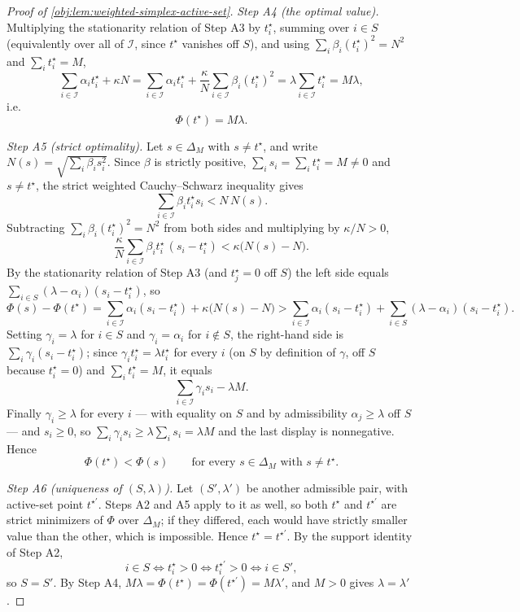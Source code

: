 \documentclass[11pt]{article}
\begin{document}
\begin{proof}[Proof of \cref{obj:lem:weighted-simplex-active-set}]
\emph{Step A4 (the optimal value).}  Multiplying the stationarity relation of Step A3 by \(t_i^\star\), summing over \(i\in S\) (equivalently over all of \(\mathcal I\), since \(t^\star\) vanishes off \(S\)), and using \(\sum_i\beta_i(t_i^\star)^2=N^2\) and \(\sum_it_i^\star=M\),
\[
\sum_{i\in\mathcal I}\alpha_it_i^\star+\kappa N
=\sum_{i\in\mathcal I}\alpha_it_i^\star+\frac{\kappa}{N}\sum_{i\in\mathcal I}\beta_i(t_i^\star)^2
=\lambda\sum_{i\in\mathcal I}t_i^\star=M\lambda ,
\]
i.e.
\[
\Phi(t^\star)=M\lambda .
\]

\emph{Step A5 (strict optimality).}  Let \(s\in\Delta_M\) with \(s\ne t^\star\), and write \(N(s)=\sqrt{\sum_i\beta_is_i^2}\).  Since \(\beta\) is strictly positive, \(\sum_is_i=\sum_it_i^\star=M\ne0\) and \(s\ne t^\star\), the strict weighted Cauchy--Schwarz inequality gives
\[
\sum_{i\in\mathcal I}\beta_it_i^\star s_i<N\,N(s).
\]
Subtracting \(\sum_i\beta_i(t_i^\star)^2=N^2\) from both sides and multiplying by \(\kappa/N>0\),
\[
\frac{\kappa}{N}\sum_{i\in\mathcal I}\beta_it_i^\star\,(s_i-t_i^\star)
<\kappa\bigl(N(s)-N\bigr).
\]
By the stationarity relation of Step A3 (and \(t_j^\star=0\) off \(S\)) the left side equals \(\sum_{i\in S}(\lambda-\alpha_i)(s_i-t_i^\star)\), so
\[
\Phi(s)-\Phi(t^\star)
=\sum_{i\in\mathcal I}\alpha_i(s_i-t_i^\star)+\kappa\bigl(N(s)-N\bigr)
>\sum_{i\in\mathcal I}\alpha_i(s_i-t_i^\star)
+\sum_{i\in S}(\lambda-\alpha_i)(s_i-t_i^\star).
\]
Setting \(\gamma_i=\lambda\) for \(i\in S\) and \(\gamma_i=\alpha_i\) for \(i\notin S\), the right-hand side is \(\sum_i\gamma_i(s_i-t_i^\star)\); since \(\gamma_it_i^\star=\lambda t_i^\star\) for every \(i\) (on \(S\) by definition of \(\gamma\), off \(S\) because \(t_i^\star=0\)) and \(\sum_it_i^\star=M\), it equals
\[
\sum_{i\in\mathcal I}\gamma_is_i-\lambda M .
\]
Finally \(\gamma_i\ge\lambda\) for every \(i\) --- with equality on \(S\) and by admissibility \(\alpha_j\ge\lambda\) off \(S\) --- and \(s_i\ge0\), so \(\sum_i\gamma_is_i\ge\lambda\sum_is_i=\lambda M\) and the last display is nonnegative.  Hence
\[
\Phi(t^\star)<\Phi(s)
\qquad\text{for every }s\in\Delta_M\text{ with }s\ne t^\star .
\]

\emph{Step A6 (uniqueness of \((S,\lambda)\)).}  Let \((S',\lambda')\) be another admissible pair, with active-set point \(t^{\star\prime}\).  Steps A2 and A5 apply to it as well, so both \(t^\star\) and \(t^{\star\prime}\) are strict minimizers of \(\Phi\) over \(\Delta_M\); if they differed, each would have strictly smaller value than the other, which is impossible.  Hence \(t^\star=t^{\star\prime}\).  By the support identity of Step A2,
\[
i\in S\iff t_i^\star>0\iff t_i^{\star\prime}>0\iff i\in S',
\]
so \(S=S'\).  By Step A4, \(M\lambda=\Phi(t^\star)=\Phi(t^{\star\prime})=M\lambda'\), and \(M>0\) gives \(\lambda=\lambda'\). %


\end{proof}
\end{document}
